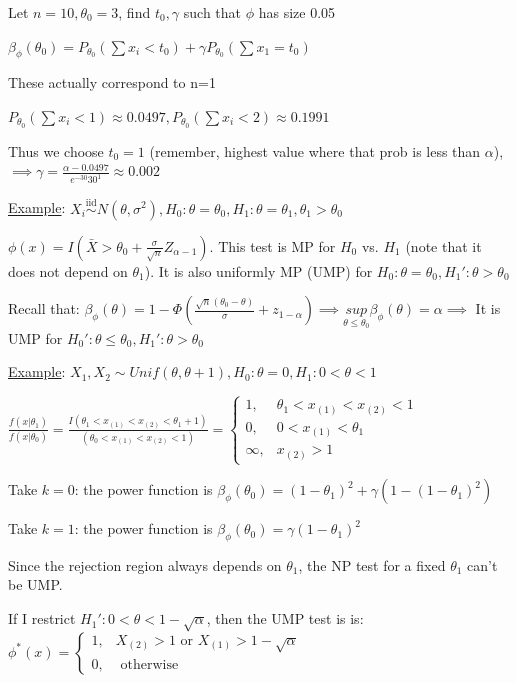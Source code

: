 \documentclass{article}
\let\Oldsum=\sum
\renewcommand{\sum}{\Oldsum\limits}
\newcommand{\iiddist}{\overset{\mathrm{iid}}{\sim}}
\begin{document}
Let $n=10, \theta_0 = 3$, find $t_0, \gamma$ such that $\phi$ has size 0.05

$\beta_{\phi}(\theta_0) = P_{\theta_0}(\sum x_i < t_0) + \gamma P_{\theta_0}(\sum x_1 = t_0)$

These actually correspond to n=1

$P_{\theta_0}(\sum x_i < 1) \approx 0.0497, P_{\theta_0}(\sum x_i < 2) \approx 0.1991$

Thus we choose $t_0 = 1$ (remember, highest value where that prob is less than $\alpha$), $\implies \gamma = \frac{\alpha - 0.0497}{e^{-30}30^1} \approx 0.002$

\underline{Example}: $X_i \iiddist N(\theta, \sigma^2), H_0: \theta = \theta_0, H_1: \theta = \theta_1, \theta_1 > \theta_0$

$\phi(x) = I(\bar{X} > \theta_0 + \frac{\sigma}{\sqrt{n}}Z_{\alpha - 1})$. This test is MP for $H_0$ vs. $H_1$ (note that it does not depend on $\theta_1$). It is also uniformly MP (UMP) for $H_0: \theta = \theta_0, H_1': \theta > \theta_0$

Recall that: $\beta_{\phi}(\theta) = 1 - \Phi(\frac{\sqrt{n}(\theta_0 - \theta)}{\sigma} + z_{1-\alpha}) \implies \underset{\theta \le \theta_0}{sup}\beta_{\phi}(\theta) = \alpha \implies $ It is UMP for $H_0': \theta \le \theta_0, H_1': \theta > \theta_0$


\underline{Example}: $X_1, X_2 \sim Unif(\theta, \theta + 1), H_0: \theta = 0, H_1: 0 < \theta < 1$

$\frac{f(x|\theta_1)}{f(x|\theta_0)} = \frac{I(\theta_1 < x_{(1)} < x_{(2)} < \theta_1 + 1)}{(\theta_0 < x_{(1)} < x_{(2)} < 1)} = \begin{cases} 1, & \theta_1 < x_{(1)} < x_{(2)} < 1 \\ 0, & 0 < x_{(1)} < \theta_1 \\ \infty, & x_{(2)} > 1 \end{cases}$

Take $k=0$: the power function is $\beta_{\phi}(\theta_0) = (1-\theta_1)^2 + \gamma (1 - (1-\theta_1)^2)$

Take $k=1$: the power function is $\beta_{\phi}(\theta_0) = \gamma (1-\theta_1)^2$

Since the rejection region always depends on $\theta_1$, the NP test for a fixed $\theta_1$ can't be UMP.

If I restrict $H_1': 0 < \theta < 1-\sqrt{\alpha}$, then the UMP test is is: $\phi^*(x) = \begin{cases} 1, & X_{(2)} > 1 \text{ or } X_{(1)} > 1 - \sqrt{\alpha} \\ 0, & \text{ otherwise } \end{cases}$
\end{document}
